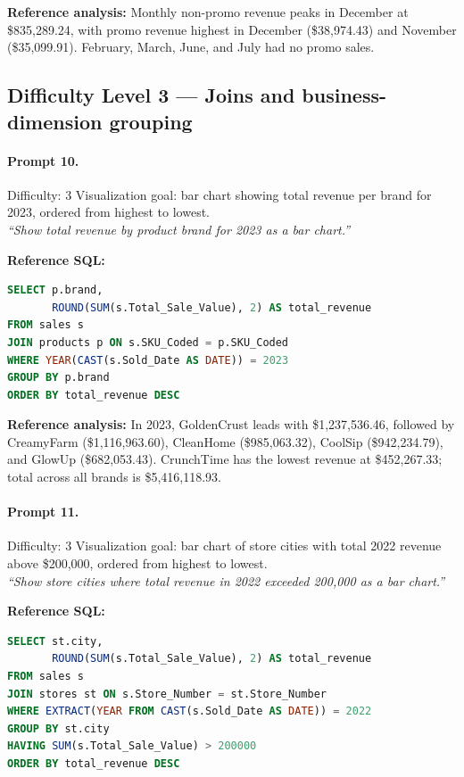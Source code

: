 \textbf{Reference analysis:}
Monthly non-promo revenue peaks in December at \$835,289.24, with promo revenue
highest in December (\$38,974.43) and November (\$35,099.91). February, March,
June, and July had no promo sales.

\subsection*{Difficulty Level 3 — Joins and business-dimension grouping}

\paragraph{Prompt 10.}
Difficulty: 3 \quad Visualization goal: bar chart showing total revenue per brand for 2023, ordered from highest to lowest.\\[2pt]
\textit{``Show total revenue by product brand for 2023 as a bar chart.''}

\textbf{Reference SQL:}
\begin{lstlisting}[language=SQL]
SELECT p.brand,
       ROUND(SUM(s.Total_Sale_Value), 2) AS total_revenue
FROM sales s
JOIN products p ON s.SKU_Coded = p.SKU_Coded
WHERE YEAR(CAST(s.Sold_Date AS DATE)) = 2023
GROUP BY p.brand
ORDER BY total_revenue DESC
\end{lstlisting}

\textbf{Reference analysis:}
In 2023, GoldenCrust leads with \$1,237,536.46, followed by CreamyFarm
(\$1,116,963.60), CleanHome (\$985,063.32), CoolSip (\$942,234.79), and GlowUp
(\$682,053.43). CrunchTime has the lowest revenue at \$452,267.33; total across all
brands is \$5,416,118.93.

\bigskip

\paragraph{Prompt 11.}
Difficulty: 3 \quad Visualization goal: bar chart of store cities with total 2022 revenue above \$200{,}000, ordered from highest to lowest.\\[2pt]
\textit{``Show store cities where total revenue in 2022 exceeded 200{,}000 as a bar chart.''}

\textbf{Reference SQL:}
\begin{lstlisting}[language=SQL]
SELECT st.city,
       ROUND(SUM(s.Total_Sale_Value), 2) AS total_revenue
FROM sales s
JOIN stores st ON s.Store_Number = st.Store_Number
WHERE EXTRACT(YEAR FROM CAST(s.Sold_Date AS DATE)) = 2022
GROUP BY st.city
HAVING SUM(s.Total_Sale_Value) > 200000
ORDER BY total_revenue DESC
\end{lstlisting}

